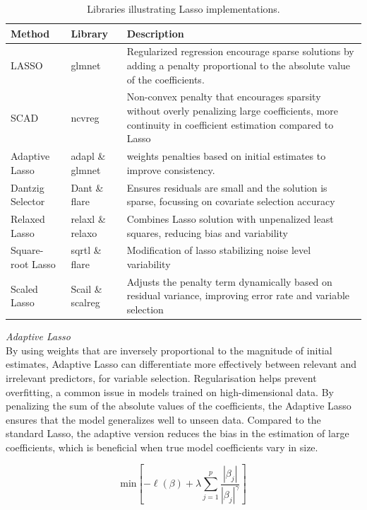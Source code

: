 \begin{table}
\begin{tabularx}{\textwidth}{|X|X|X|}
    \hline
    Method & Library & Description \\
    \hline
    LASSO & glmnet & Regularized regression encourage sparse solutions by adding a penalty proportional to the absolute value of the coefficients. \\
    \hline
    SCAD & ncvreg & Non-convex penalty that encourages sparsity without overly penalizing large coefficients, more continuity in coefficient estimation compared to Lasso \\
    \hline
    Adaptive Lasso & adapl \& glmnet & weights penalties based on initial estimates to improve consistency. \\
    \hline
    Dantzig Selector & Dant \& flare & Ensures residuals are small and the solution is sparse, focussing on covariate selection accuracy \\
    \hline
    Relaxed Lasso & relaxl \& relaxo & Combines Lasso solution with unpenalized least squares, reducing bias and variability  \\
    \hline
    Square-root Lasso & sqrtl \& flare & Modification of lasso stabilizing noise level variability \\
    \hline
    Scaled Lasso & Scail \& scalreg & Adjusts the penalty term dynamically based on residual variance, improving error rate and variable selection \\
    \hline
\end{tabularx}
\caption{Libraries illustrating Lasso implementations. \parencite{freijeirogonzalez_critical_2022}}
\label{tab:methlasso}
\end{table}
\pagebreak
\noindent \textit{Adaptive Lasso}
\\
\noindent By using weights that are inversely proportional to the magnitude of initial estimates, \parencite{zhang_adaptive_2007} Adaptive Lasso can differentiate more effectively between relevant and irrelevant predictors, for variable selection. Regularisation helps prevent overfitting, a common issue in models trained on high-dimensional data. \parencite{zhang_adaptive_2007} By penalizing the sum of the absolute values of the coefficients, the Adaptive Lasso ensures that the model generalizes well to unseen data. Compared to the standard Lasso, the adaptive version reduces the bias in the estimation of large coefficients, which is beneficial when true model coefficients vary in size. 

\begin{equation} \label{eq:adaptlasso}
\text{min}\left[ -\ell(\beta) + \lambda \sum_{j=1}^{p} \frac{|\beta_j|}{|\beta_j|^\gamma} \right]
\end{equation}

